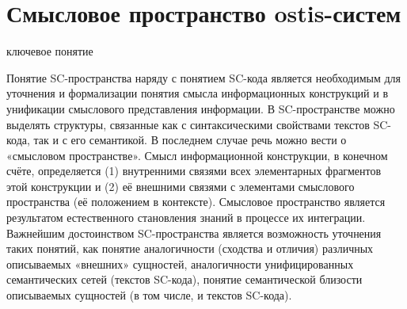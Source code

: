 \newpage

\section{Смысловое пространство ostis-систем}
\label{sec_sr_semspace}
\begin{SCn}
	\begin{scnrelfromlist}{ключевое понятие}
	\end{scnrelfromlist}
\end{SCn}

Понятие SC-пространства наряду с понятием SC-кода является необходимым для уточнения и формализации понятия смысла информационных конструкций и в унификации смыслового представления информации. В SC-пространстве можно выделять структуры, связанные как с синтаксическими свойствами текстов SC-кода, так и с его семантикой. В последнем случае речь можно вести о «смысловом пространстве». Смысл информационной конструкции, в конечном счёте, определяется (1) внутренними связями всех элементарных фрагментов этой конструкции и (2) её внешними связями с элементами смыслового пространства (её положением в контексте). Смысловое пространство является результатом естественного становления знаний в процессе их интеграции.
Важнейшим достоинством SC-пространства является возможность уточнения таких понятий, как понятие аналогичности (сходства и отличия) различных описываемых «внешних» сущностей, аналогичности унифицированных семантических сетей (текстов SC-кода), понятие семантической близости описываемых сущностей (в том числе, и текстов SC-кода).

